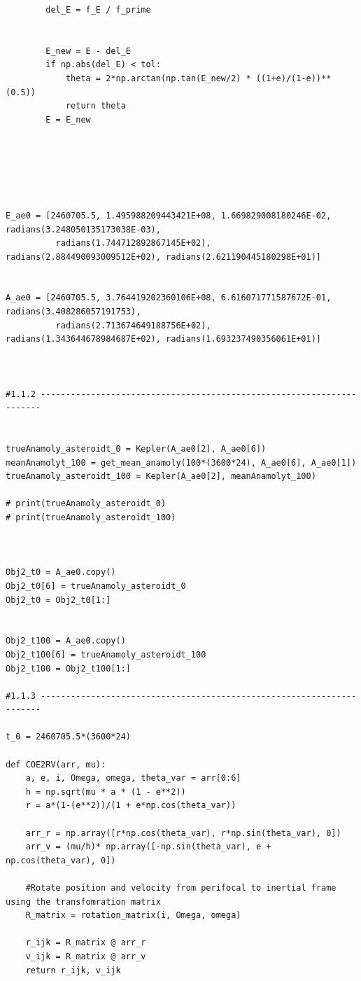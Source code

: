\documentclass[12pt,twocolumn]{article}  %
\begin{document}
\begin{verbatim}
        del_E = f_E / f_prime
        
        
        E_new = E - del_E
        if np.abs(del_E) < tol:
            theta = 2*np.arctan(np.tan(E_new/2) * ((1+e)/(1-e))**(0.5))
            return theta
        E = E_new
 
        



    
E_ae0 = [2460705.5, 1.495988209443421E+08, 1.669829008180246E-02, radians(3.248050135173038E-03), 
          radians(1.744712892867145E+02), radians(2.884490093009512E+02), radians(2.621190445180298E+01)]


A_ae0 = [2460705.5, 3.764419202360106E+08, 6.616071771587672E-01, radians(3.408286057191753),
          radians(2.713674649188756E+02), radians(1.343644678984687E+02), radians(1.693237490356061E+01)]



#1.1.2 ----------------------------------------------------------------------


trueAnamoly_asteroidt_0 = Kepler(A_ae0[2], A_ae0[6])
meanAnamolyt_100 = get_mean_anamoly(100*(3600*24), A_ae0[6], A_ae0[1])
trueAnamoly_asteroidt_100 = Kepler(A_ae0[2], meanAnamolyt_100)

# print(trueAnamoly_asteroidt_0)
# print(trueAnamoly_asteroidt_100)



Obj2_t0 = A_ae0.copy()
Obj2_t0[6] = trueAnamoly_asteroidt_0
Obj2_t0 = Obj2_t0[1:]


Obj2_t100 = A_ae0.copy()
Obj2_t100[6] = trueAnamoly_asteroidt_100
Obj2_t100 = Obj2_t100[1:]

#1.1.3 ----------------------------------------------------------------------

t_0 = 2460705.5*(3600*24)

def COE2RV(arr, mu):
    a, e, i, Omega, omega, theta_var = arr[0:6]
    h = np.sqrt(mu * a * (1 - e**2))
    r = a*(1-(e**2))/(1 + e*np.cos(theta_var))
    
    arr_r = np.array([r*np.cos(theta_var), r*np.sin(theta_var), 0])
    arr_v = (mu/h)* np.array([-np.sin(theta_var), e + np.cos(theta_var), 0])

    #Rotate position and velocity from perifocal to inertial frame using the transfomration matrix
    R_matrix = rotation_matrix(i, Omega, omega)
   
    r_ijk = R_matrix @ arr_r
    v_ijk = R_matrix @ arr_v
    return r_ijk, v_ijk





\end{verbatim}
\end{document}
